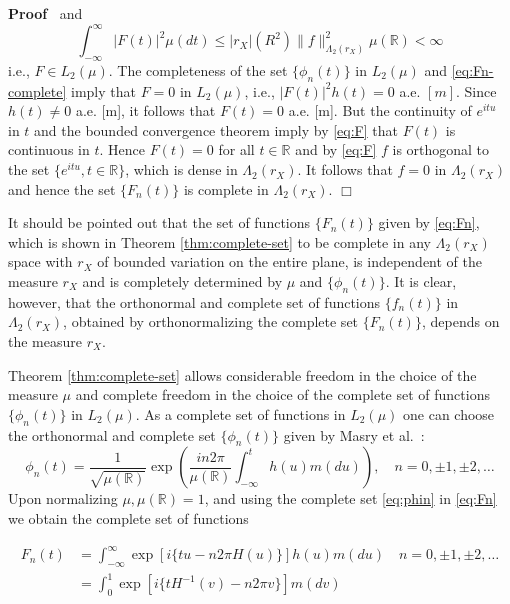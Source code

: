\documentclass{article}
\newenvironment{proof}{\noindent\textbf{Proof\ }}{\hspace*{\fill}$\Box$\medskip}
\begin{document}
\begin{proof}
  and
  \begin{equation}
    \int_{- \infty}^{\infty} |F (t) |^2 \mu (dt) \leqslant |r_X | (R^2)
    \|f\|_{\Lambda_2 (r_X)}^2 \mu (\mathbb{R}) < \infty \label{eq:F-L2}
  \end{equation}
  i.e., $F \in L_2 (\mu)$. The completeness of the set $\{\phi_n (t)\}$ in
  $L_2 (\mu)$ and \eqref{eq:Fn-complete} imply that $F = 0$ in $L_2 (\mu)$,
  i.e., $|F (t) |^2 h (t) = 0$ a.e. $[m]$. Since $h (t) \neq 0$ a.e. [m], it
  follows that $F (t) = 0$ a.e. [m]. But the continuity of $e^{itu}$ in $t$
  and the bounded convergence theorem imply by \eqref{eq:F} that $F (t)$ is
  continuous in $t$. Hence $F (t) = 0$ for all $t \in \mathbb{R}$ and by
  \eqref{eq:F} $f$ is orthogonal to the set $\{e^{itu}, t \in \mathbb{R}\}$,
  which is dense in $\Lambda_2 (r_X)$. It follows that $f = 0$ in $\Lambda_2
  (r_X)$ and hence the set $\{F_n (t)\}$ is complete in $\Lambda_2 (r_X)$.
\end{proof}

It should be pointed out that the set of functions $\{F_n (t)\}$ given by
\eqref{eq:Fn}, which is shown in Theorem \ref{thm:complete-set} to be complete
in any $\Lambda_2 (r_X)$ space with $r_X$ of bounded variation on the entire
plane, is independent of the measure $r_X$ and is completely determined by
$\mu$ and $\{\phi_n (t)\}$. It is clear, however, that the orthonormal and
complete set of functions $\{f_n (t)\}$ in $\Lambda_2 (r_X)$, obtained by
orthonormalizing the complete set $\{F_n (t)\}$, depends on the measure $r_X$.

Theorem \ref{thm:complete-set} allows considerable freedom in the choice of
the measure $\mu$ and complete freedom in the choice of the complete set of
functions $\{\phi_n (t)\}$ in $L_2 (\mu)$. As a complete set of functions in
$L_2 (\mu)$ one can choose the orthonormal and complete set $\{\phi_n (t)\}$
given by Masry et al.~{\cite{masry1968}}:
\begin{equation}
  \phi_n (t) = \frac{1}{\sqrt{\mu (\mathbb{R})}} \exp \left( \frac{in 2
  \pi}{\mu (\mathbb{R})}  \int_{- \infty}^t h (u) m (du) \right), \quad n = 0,
  \pm 1, \pm 2, \ldots \label{eq:phin}
\end{equation}
Upon normalizing $\mu, \mu (\mathbb{R}) = 1$, and using the complete set
\eqref{eq:phin} in \eqref{eq:Fn} we obtain the complete set of functions

\begin{align}
  F_n (t) & = \int_{- \infty}^{\infty} \exp [i\{tu - n 2 \pi H (u)\}] h (u) m
  (du)  \quad n = 0, \pm 1, \pm 2, \ldots \\
  & = \int_0^1 \exp [i\{tH^{- 1} (v) - n 2 \pi v\}] m (dv)  \label{eq:Fn-exp}
\end{align}
\end{document}
